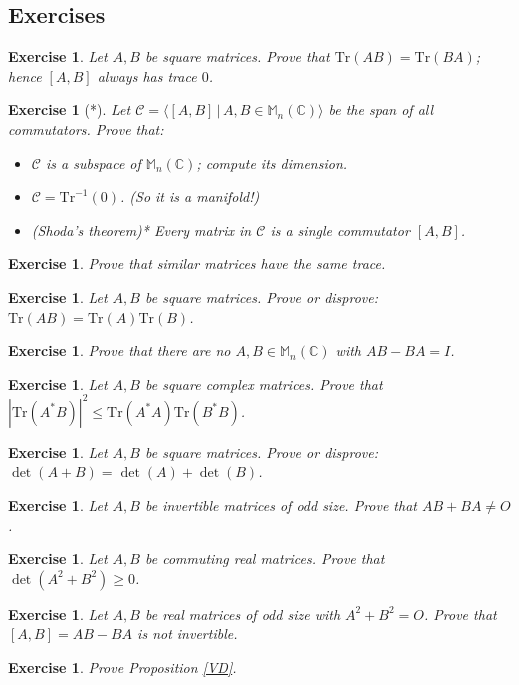 \documentclass[12pt]{article}
\newcommand{\double}{\hspace{2pt}}
\renewcommand{\Tr}{\mathrm{Tr}}
\theoremstyle{breakplain}
\theoremstyle{breakdef}
\newtheorem{ex}[subsubsection]{Exercise}
\theoremstyle{remark}
\begin{document}
\subsection{Exercises}
\begin{ex}
    Let $A,B$ be square matrices. Prove that $ \Tr(AB)=\Tr(BA) $; hence $[A,B]$ always has trace $0$.
\end{ex}
\begin{ex}[*]
    Let $\mathscr{C}=\langle [A,B] \double | \double A,B \in \mathbb{M}_n(\mathbb{C})\rangle$ be the span of all commutators. Prove that:
    \begin{itemize}
        \item $\mathscr{C}$ is a subspace of $\mathbb{M}_n(\mathbb{C})$; compute its dimension.
        \item $\mathscr{C}=\Tr^{-1}(0)$. (So it is a manifold!)
        \item \textup{(Shoda's theorem)*} Every matrix in $\mathscr{C}$ is a single commutator $[A,B]$.
    \end{itemize}
\end{ex}
\begin{ex}
    Prove that similar matrices have the same trace.
\end{ex}
\begin{ex}
    Let $A,B$ be square matrices. Prove or disprove: $ \Tr(AB)=\Tr(A)\Tr(B) $.
\end{ex}
\begin{ex}
    Prove that there are no $A,B\in \mathbb{M}_n(\mathbb{C})$ with $AB-BA=I$.
\end{ex}
\begin{ex}
    Let $A,B$ be square complex matrices. Prove that $|\Tr(A^*B)|^2 \leq \Tr(A^*A)\Tr(B^*B)$.
\end{ex}
\begin{ex}
    Let $A,B$ be square matrices. Prove or disprove: $ \det(A+B)=\det(A) + \det(B) $.
\end{ex}
\begin{ex}
    Let $ A,B $ be invertible matrices of odd size. Prove that $ AB+BA \neq O $.
\end{ex}
\begin{ex}
    Let $ A,B $ be commuting real matrices. Prove that $ \det(A^2+B^2)\geq 0 $.
\end{ex}
\begin{ex}
    Let $ A,B $ be real matrices of odd size with $ A^2 + B^2 = O $. Prove that $ [A,B]=AB-BA $ is not invertible.
\end{ex}
\begin{ex}
    Prove Proposition \ref{VD}.
\end{ex}
\end{document}
